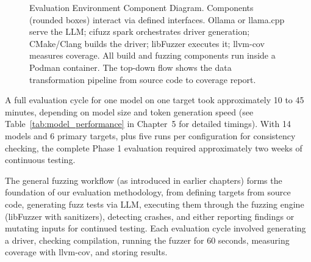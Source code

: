 \begin{figure}[htbp]
{
    }
    \caption{Evaluation Environment Component Diagram. Components (rounded boxes) interact via defined interfaces. Ollama or llama.cpp serve the LLM; cifuzz spark orchestrates driver generation; CMake/Clang builds the driver; libFuzzer executes it; llvm-cov measures coverage. All build and fuzzing components run inside a Podman container. The top-down flow shows the data transformation pipeline from source code to coverage report.}
    \label{fig:eval_environment}
\end{figure}

A full evaluation cycle for one model on one target took approximately 10 to 45 minutes, depending on model size and token generation speed (see Table~\ref{tab:model_performance} in Chapter~5 for detailed timings). With 14 models and 6 primary targets, plus five runs per configuration for consistency checking, the complete Phase 1 evaluation required approximately two weeks of continuous testing.

The general fuzzing workflow (as introduced in earlier chapters) forms the foundation of our evaluation methodology, from defining targets from source code, generating fuzz tests via LLM, executing them through the fuzzing engine (libFuzzer with sanitizers), detecting crashes, and either reporting findings or mutating inputs for continued testing. Each evaluation cycle involved generating a driver, checking compilation, running the fuzzer for 60 seconds, measuring coverage with llvm-cov, and storing results.

